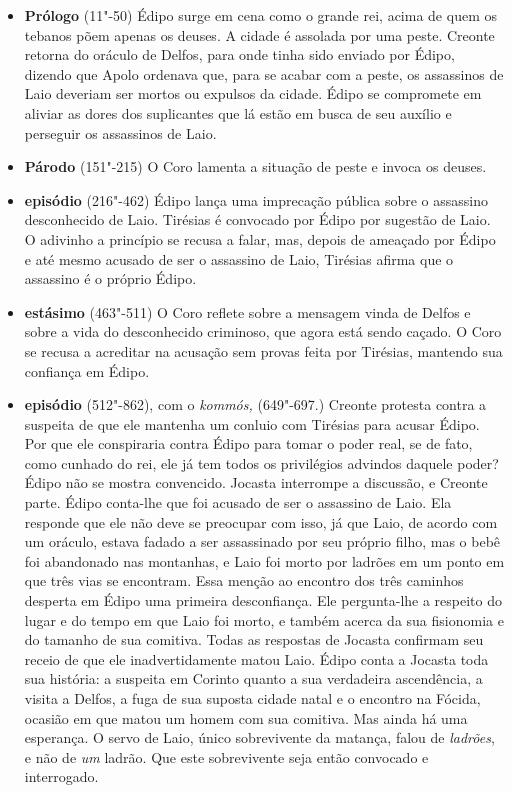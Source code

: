 \begin{itemize}
\item \textbf{Prólogo} (11"-50) Édipo surge em cena como o
grande rei, acima de quem os tebanos põem apenas os deuses. A cidade é
assolada por uma peste. Creonte retorna do oráculo de Delfos, para onde
tinha sido enviado por Édipo, dizendo que Apolo ordenava que, para se
acabar com a peste, os assassinos de Laio deveriam ser mortos ou
expulsos da cidade. Édipo se compromete em aliviar as dores dos
suplicantes que lá estão em busca de seu auxílio e perseguir os
assassinos de Laio.

\item \textbf{Párodo} (151"-215) O Coro lamenta a situação
de peste e invoca os deuses.

\item \textbf{ episódio} (216"-462) Édipo lança uma
imprecação pública sobre o assassino desconhecido de Laio. Tirésias é
convocado por Édipo por sugestão de Laio. O adivinho a princípio se
recusa a falar, mas, depois de ameaçado por Édipo e até mesmo acusado de
ser o assassino de Laio, Tirésias afirma que o assassino é o próprio
Édipo.

\item \textbf{ estásimo} (463"-511) O Coro reflete sobre a
mensagem vinda de Delfos e sobre a vida do desconhecido criminoso, que
agora está sendo caçado. O Coro se recusa a acreditar na acusação sem
provas feita por Tirésias, mantendo sua confiança em Édipo.

\item \textbf{ episódio} (512"-862), com o \emph{kommós,} (649"-697.) 
Creonte protesta contra a suspeita de que ele mantenha um
conluio com Tirésias para acusar Édipo. Por que ele conspiraria contra
Édipo para tomar o poder real, se de fato, como cunhado do rei, ele já
tem todos os privilégios advindos daquele poder? Édipo não se mostra
convencido. Jocasta interrompe a discussão, e Creonte parte. Édipo
conta-lhe que foi acusado de ser o assassino de Laio. Ela responde que
ele não deve se preocupar com isso, já que Laio, de acordo com um
oráculo, estava fadado a ser assassinado por seu próprio filho, mas o
bebê foi abandonado nas montanhas, e Laio foi morto por ladrões em um
ponto em que três vias se encontram. Essa menção ao encontro dos três
caminhos desperta em Édipo uma primeira desconfiança. Ele pergunta-lhe a
respeito do lugar e do tempo em que Laio foi morto, e também acerca da
sua fisionomia e do tamanho de sua comitiva. Todas as respostas de
Jocasta confirmam seu receio de que ele inadvertidamente matou Laio.
Édipo conta a Jocasta toda sua história: a suspeita em Corinto quanto a
sua verdadeira ascendência, a visita a Delfos, a fuga de sua suposta
cidade natal e o encontro na Fócida, ocasião em que matou um homem com
sua comitiva. Mas ainda há uma esperança. O servo de Laio, único
sobrevivente da matança, falou de \emph{ladrões}, e não de \emph{um}
ladrão. Que este sobrevivente seja então convocado e interrogado.


\end{itemize}
